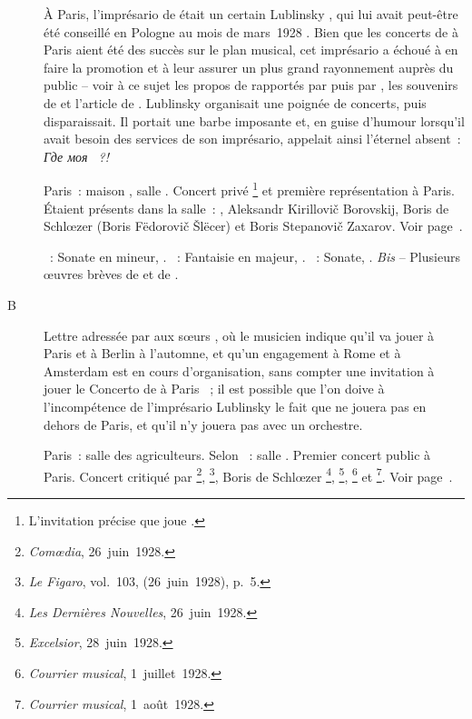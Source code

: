 \begin{description}
 À Paris, l'imprésario de \VSofronitsky{} était un certain Lublinsky
 \citep[voir][p.~56]{Juban}, qui lui avait peut-être été conseillé en
 Pologne au mois de mars~1928 \citep[voir][p.~89]{Artese}.
 Bien que les concerts de \Sofronitsky{} à Paris aient été des succès sur
 le plan musical, cet imprésario a échoué à en faire la promotion et à leur
 assurer un plus grand rayonnement auprès du public -- voir à ce sujet les
 propos de \RKoganSofronitskaya{} rapportés par \citet[p.~112-113]{White}
 puis par \citet[p.~89]{Artese}, les souvenirs de
 \citet[p.~131-132]{Nikonovich08a} et l'article de \citet[p.~56]{Juban}.
 Lublinsky organisait une poignée de concerts, puis disparaissait.
 Il portait une barbe imposante et, en guise d'humour lorsqu'il avait besoin
 des services de son imprésario, \VSofronitsky{} appelait ainsi l'éternel
 absent~: \foreignlanguage{russian}{\emph{Где моя ~?!}}
 \item[\DateWithWeekDay{1928-05-31}]
 Paris~: maison \Pleyel{}, salle \Debussy{}.
 Concert privé%
 \footnote{L'invitation précise que \VSofronitsky{} joue .}
 et première représentation à Paris.
 Étaient présents dans la salle~: \SProkofiev{}, Aleksandr Kirillovič
 Borovskij, Boris de Schlœzer (Boris Fëdorovič Šlëcer) et Boris Stepanovič
 Zaxarov.
 Voir page~\pageref{rec:Paris0}.

 \textsc{\Beethoven{}}~: Sonate en \kC mineur, .
 \textsc{\Schumann{}}~: Fantaisie en \kC majeur, .
 \textsc{\Scriabine{}}~: Sonate, .
 \emph{Bis} -- Plusieurs œuvres brèves de \Chopin{} et de \Scriabine{}.
 \item[B\DateWithWeekDay{1928-06-15}]
 Lettre adressée par \VSofronitsky{} aux sœurs \Vizel{}, où le musicien
 indique qu'il va jouer à Paris et à Berlin à l'automne, et qu'un engagement
 à Rome et à Amsterdam est en cours d'organisation, sans compter une
 invitation à jouer le Concerto de \Scriabine{} à Paris
 \citep[voir][p.~150]{Nekrasova08}~; il est possible que l'on doive à
 l'incompétence de l'imprésario Lublinsky le fait que \Sofronitsky{} ne
 jouera pas en dehors de Paris, et qu'il n'y jouera pas avec un orchestre.
 \item[\DateWithWeekDay{1928-06-18}]
 Paris~: salle des agriculteurs.
 Selon \citet[p.~400]{Scriabine}~: salle \Chopin{}.
 Premier concert public à Paris.
 Concert critiqué par \citeauthor{Messager}%
 \footnote{\emph{Comœdia}, 26~juin~1928.},
 \citeauthor{Golestan28a}%
 \footnote{\emph{Le Figaro}, vol.~103,  (26~juin~1928), p.~5.},
 Boris de Schlœzer%
 \footnote{\emph{Les Dernières Nouvelles}, 26~juin~1928.},
 \citeauthor{Tromp}%
 \footnote{\emph{Excelsior}, 28~juin~1928.},
 \citeauthor{Ple}%
 \footnote{\emph{Courrier musical}, 1\ier{}~juillet~1928.}
 et \citeauthor{Wolf28}%
 \footnote{\emph{Courrier musical}, 1\ier{}~août~1928.}.
 Voir page~\pageref{rec:Paris1}.


\end{description}
